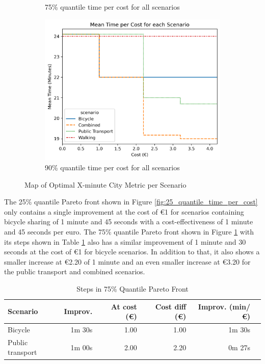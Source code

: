 \begin{figure}
\begin{subfigure}[b]{0.48\textwidth}
         \caption{75\% quantile time per cost for all scenarios}
         \label{fig:75_quantile_time_per_cost}
     \end{subfigure}
     \hfill
     \begin{subfigure}[b]{0.48\textwidth}
         \centering
         \includegraphics[width=\textwidth]{Figures/results/metric_cost/quantile_90_time_per_cost_for_each_scenario_without_car.png}
         \caption{90\% quantile time per cost for all scenarios}
         \label{fig:90_quantile_time_per_cost}
     \end{subfigure}
        \caption{Map of Optimal X-minute City Metric per Scenario}
        \label{fig:quantile_time_per_cost}
\end{figure}
The 25\% quantile Pareto front shown in Figure \ref{fig:25_quantile_time_per_cost} only contains a single improvement at the cost of \euro{1} for scenarios containing bicycle sharing of 1 minute and 45 seconds with a cost-effectiveness of 1 minute and 45 seconds per euro.
The 75\% quantile Pareto front shown in Figure \ref{fig:75_quantile_time_per_cost} with its steps shown in Table \ref{tab:differences_in_75_quantile_pareto_front} also has a similar improvement of 1 minute and 30 seconds at the cost of \euro{1} for bicycle scenarios.
In addition to that, it also shows a smaller increase at \euro{2.20} of 1 minute and an even smaller increase at \euro{3.20} for the public transport and combined scenarios.
\begin{table}
  \caption{Steps in 75\% Quantile Pareto Front}
  \label{tab:differences_in_75_quantile_pareto_front}
  \begin{center}
    \begin{tabular}{|l|r|r|r|r|l|}
    \hline
     Scenario & Improv. & At cost (\euro) & Cost diff (\euro) & Improv. (min/\euro) \\
     \hline
     Bicycle & 1m 30s & 1.00 & 1.00 & 1m 30s \\
     \hline
     Public transport & 1m 00s & 2.00 & 2.20 & 0m 27s \\
     \hline
    \end{tabular}
  \end{center}
\end{table}
